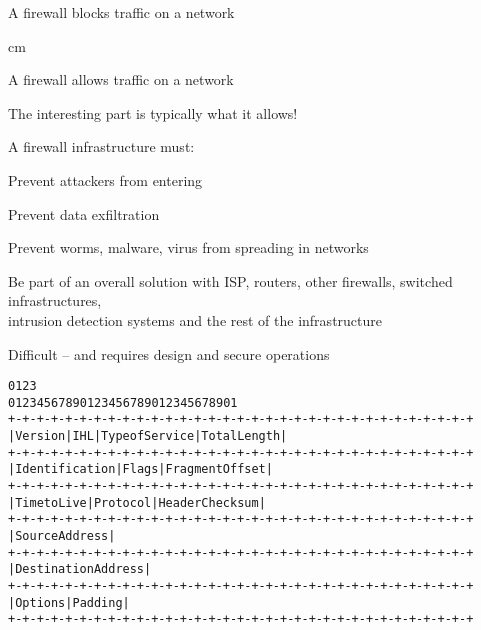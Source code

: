 \documentclass[Screen16to9,17pt]{foils}
\begin{document}


\centerline{\hlkbig A firewall {\color{security6blue}blocks traffic} on a network}

 cm
\pause

\centerline{\hlkbig A firewall {\color{red}allows traffic} on a network}
{\small The interesting part is typically what it allows!}

\begin{list1}
\item A firewall infrastructure must:
\begin{list2}
\item Prevent attackers from entering
\item Prevent data exfiltration
\item Prevent worms, malware, virus from spreading in networks
\item Be part of an overall solution with ISP, routers, other firewalls, switched infrastructures,\\
  intrusion detection systems and the rest of the infrastructure
\end{list2}
\end{list1}

\vskip 5mm
\centerline{Difficult -- and requires design and secure operations}



\begin{alltt}\footnotesize
0                   1                   2                   3
0 1 2 3 4 5 6 7 8 9 0 1 2 3 4 5 6 7 8 9 0 1 2 3 4 5 6 7 8 9 0 1
+-+-+-+-+-+-+-+-+-+-+-+-+-+-+-+-+-+-+-+-+-+-+-+-+-+-+-+-+-+-+-+-+
|Version|  IHL  |Type of Service|          Total Length         |
+-+-+-+-+-+-+-+-+-+-+-+-+-+-+-+-+-+-+-+-+-+-+-+-+-+-+-+-+-+-+-+-+
|         Identification        |Flags|      Fragment Offset    |
+-+-+-+-+-+-+-+-+-+-+-+-+-+-+-+-+-+-+-+-+-+-+-+-+-+-+-+-+-+-+-+-+
|  Time to Live |    Protocol   |         Header Checksum       |
+-+-+-+-+-+-+-+-+-+-+-+-+-+-+-+-+-+-+-+-+-+-+-+-+-+-+-+-+-+-+-+-+
|                       Source Address                          |
+-+-+-+-+-+-+-+-+-+-+-+-+-+-+-+-+-+-+-+-+-+-+-+-+-+-+-+-+-+-+-+-+
|                    Destination Address                        |
+-+-+-+-+-+-+-+-+-+-+-+-+-+-+-+-+-+-+-+-+-+-+-+-+-+-+-+-+-+-+-+-+
|                    Options                    |    Padding    |
+-+-+-+-+-+-+-+-+-+-+-+-+-+-+-+-+-+-+-+-+-+-+-+-+-+-+-+-+-+-+-+-+
\end{alltt}
\end{document}
